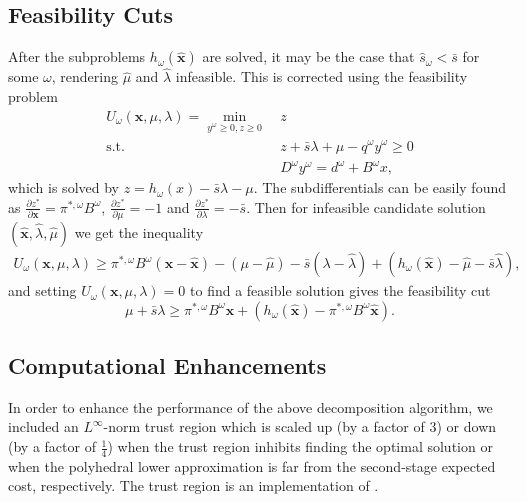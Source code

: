 \documentclass[12pt]{article}
\newcommand{\x}{\mathbf{x}}
\newcommand{\xh}{\hat{\x}}
\newcommand{\lh}{\hat{\lambda}}
\newcommand{\mh}{\hat{\mu}}
\theoremstyle{plain}
\theoremstyle{definition}
\theoremstyle{remark}
\newcommand{\st}{\mbox{s.t.}}
\begin{document}
\subsection{Feasibility Cuts}
After the subproblems $h_\omega(\xh)$ are solved, it may be the case that $\hat{s}_\omega < \bar{s}$ for some $\omega$, rendering $\mh$ and $\lh$ infeasible.
This is corrected using the feasibility problem
\begin{align*}
	U_\omega(\x,\mu,\lambda) = \min_{y^\omega \geq 0, z \geq 0} \ & z \\
	\st \ & z + \bar{s}\lambda + \mu - q^\omega y^\omega \geq 0 \\
	& D^\omega y^\omega = d^\omega + B^\omega x,
\end{align*}
which is solved by $z = h_\omega(x) - \bar{s}\lambda - \mu$.
The subdifferentials can be easily found as $\frac{\partial z^*}{\partial \x} = \pi^{*,\omega} B^\omega$, $\frac{\partial z^*}{\partial \mu} = -1$ and $\frac{\partial z^*}{\partial \lambda} = -\bar{s}$.
Then for infeasible candidate solution $(\xh,\lh,\mh)$ we get the inequality
\begin{align*}
	U_\omega(\x,\mu,\lambda) \geq \pi^{*,\omega}B^\omega(\x-\xh) - (\mu -\mh) - \bar{s}(\lambda - \lh) + (h_\omega(\xh) - \mh - \bar{s}\lh),
\end{align*}
and setting $U_\omega(\x,\mu,\lambda) = 0$ to find a feasible solution gives the feasibility cut
\[
	\mu + \bar{s} \lambda \geq \pi^{*,\omega}B^\omega \x + (h_\omega(\xh) - \pi^{*,\omega}B^\omega\xh).
\]


\subsection{Computational Enhancements}

In order to enhance the performance of the above decomposition algorithm, we included an $L^\infty$-norm trust region which is scaled up (by a factor of $3$) or down (by a factor of $\tfrac{1}{4}$) when the trust region inhibits finding the optimal solution or when the polyhedral lower approximation is far from the second-stage expected cost, respectively.
The trust region is an implementation of \citep[Algorithm 4.1]{nocedal1999numerical}.
\end{document}

